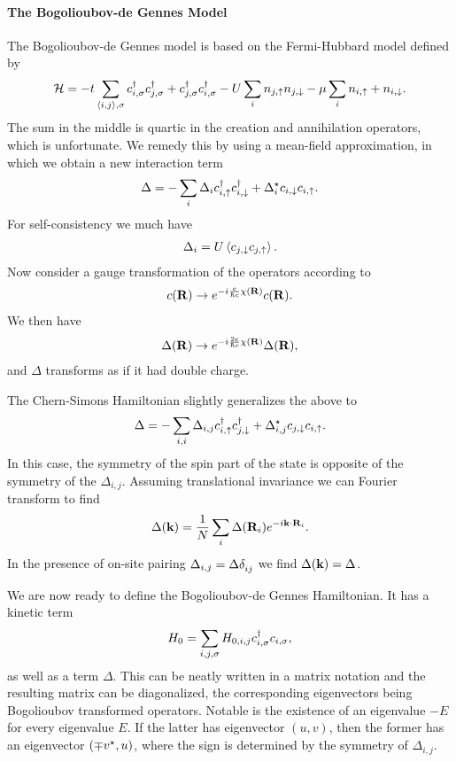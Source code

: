 \paragraph{The Bogolioubov-de Gennes Model}
The Bogolioubov-de Gennes model is based on the Fermi-Hubbard model defined by
\begin{align*}
	\mathcal{H} = -t\sum\limits_{\expval{i, j}, \sigma}c_{i, \sigma}^{\dagger} c_{j, \sigma}^{\dagger} + c_{j, \sigma}^{\dagger} c_{i, \sigma}^{\dagger} - U\sum\limits_{i}n_{j, \uparrow}n_{j, \downarrow} - \mu\sum\limits_{i}n_{i, \uparrow} + n_{i, \downarrow}.
\end{align*}
The sum in the middle is quartic in the creation and annihilation operators, which is unfortunate. We remedy this by using a mean-field approximation, in which we obtain a new interaction term
\begin{align*}
	\Delta = -\sum\limits_{i}\Delta_{i}c_{i, \uparrow}^{\dagger} c_{i, \downarrow}^{\dagger} + \Delta_{i}^{\star} c_{i, \downarrow}c_{i, \uparrow}.
\end{align*}
For self-consistency we much have
\begin{align*}
	\Delta_{i} = U\expval{c_{j, \downarrow}c_{j, \uparrow}}.
\end{align*}
Now consider a gauge transformation of the operators according to
\begin{align*}
	c(\vb{R})\to e^{-i\frac{e}{\hbar c}\chi(\vb{R})}c(\vb{R}).
\end{align*}
We then have
\begin{align*}
	\Delta(\vb{R})\to e^{-i\frac{2e}{\hbar c}\chi(\vb{R})}\Delta(\vb{R}),
\end{align*}
and $\Delta$ transforms as if it had double charge.

The Chern-Simons Hamiltonian slightly generalizes the above to
\begin{align*}
	\Delta = -\sum\limits_{i, i}\Delta_{i, j}c_{i, \uparrow}^{\dagger} c_{j, \downarrow}^{\dagger} + \Delta_{i, j}^{\star} c_{j, \downarrow}c_{i, \uparrow}.
\end{align*}
In this case, the symmetry of the spin part of the state is opposite of the symmetry of the $\Delta_{i, j}$. Assuming translational invariance we can Fourier transform to find
\begin{align*}
	\Delta(\vb{k}) = \frac{1}{N}\sum\limits_{i}\Delta(\vb{R}_{i})e^{-i\vb{k}\cdot\vb{R}_{i}}.
\end{align*}
In the presence of on-site pairing $\Delta_{i, j} = \Delta\kdelta{}{ij}$ we find $\Delta(\vb{k}) = \Delta$.

We are now ready to define the Bogolioubov-de Gennes Hamiltonian. It has a kinetic term
\begin{align*}
	H_{0} = \sum\limits_{i, j, \sigma}H_{0, i, j}c_{i, \sigma}^{\dagger} c_{i, \sigma},
\end{align*}
as well as a term $\Delta$. This can be neatly written in a matrix notation and the resulting matrix can be diagonalized, the corresponding eigenvectors being Bogolioubov transformed operators. Notable is the existence of an eigenvalue $-E$ for every eigenvalue $E$. If the latter has eigenvector $(u, v)$, then the former has an eigenvector $(\mp v^{\star}, u)$, where the sign is determined by the symmetry of $\Delta_{i, j}$.

